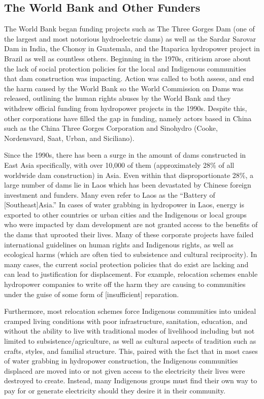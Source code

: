 \documentclass{book}\usepackage{knitr}
\begin{document}
\subsection{The World Bank and Other Funders}
  The World Bank began funding projects such as The Three Gorges Dam (one of the largest and most notorious hydroelectric dams) as well as the Sardar Sarovar Dam in India, the Chonoy in Guatemala, and the Itaparica hydropower project in Brazil as well as countless others. Beginning in the 1970s, criticism arose about the lack of social protection policies for the local and Indigenous communities that dam construction was impacting. Action was called to both assess, and end the harm caused by the World Bank so the World Commission on Dams was released, outlining the human rights abuses by the World Bank and they withdrew official funding from hydropower projects in the 1990s. Despite this, other corporations have filled the gap in funding, namely actors based in China such as the China Three Gorges Corporation and Sinohydro (Cooke, Nordensvard, Saat, Urban, and Siciliano). 
  
  Since the 1990s, there has been a surge in the amount of dams constructed in East Asia specifically, with over 10,000 of them (approximately 28\% of all worldwide dam construction) in Asia. Even within that disproportionate 28\%, a large number of dams lie in Laos which has been devastated by Chinese foreign investment and funders. Many even refer to Laos as the “Battery of [Southeast]Asia.” In cases of water grabbing in hydropower in Laos, energy is exported to other countries or urban cities and the Indigenous or local groups who were impacted by dam development are not granted access to the benefits of the dams that uprooted their lives. Many of these corporate projects have failed international guidelines on human rights and Indigenous rights, as well as ecological harms (which are often tied to subsistence and cultural reciprocity).  
  In many cases, the current social protection policies that do exist are lacking and can lead to justification for displacement. For example, relocation schemes enable hydropower companies to write off the harm they are causing to communities under the guise of some form of [insufficient] reparation. 
  
  Furthermore, most relocation schemes force Indigenous communities into unideal cramped living conditions with poor infrastructure, sanitation, education, and without the ability to live with traditional modes of livelihood including but not limited to subsistence/agriculture, as well as cultural aspects of tradition such as crafts, styles, and familial structure. This, paired with the fact that in most cases of water grabbing in hydropower construction, the Indigenous communities displaced are moved into or not given access to the electricity their lives were destroyed to create. Instead, many Indigenous groups must find their own way to pay for or generate electricity should they desire it in their community.  
\end{document}
